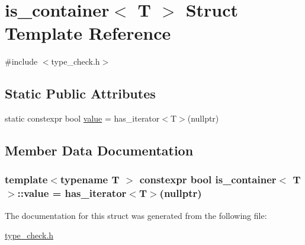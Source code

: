 \hypertarget{structis__container}{\section{is\-\_\-container$<$ T $>$ Struct Template Reference}
\label{structis__container}
}


{\ttfamily \#include $<$type\-\_\-check.\-h$>$}

\subsection*{Static Public Attributes}
\begin{DoxyCompactItemize}
\item 
static constexpr bool \hyperlink{structis__container_abe72bf896680aa10340ccf08a5d293c7}{value} = has\-\_\-iterator$<$T$>$(nullptr)
\end{DoxyCompactItemize}


\subsection{Member Data Documentation}
\hypertarget{structis__container_abe72bf896680aa10340ccf08a5d293c7}{
\subsubsection[{value}]{\setlength{\rightskip}{0pt plus 5cm}template$<$typename T $>$ constexpr bool {\bf is\-\_\-container}$<$ T $>$\-::value = has\-\_\-iterator$<$T$>$(nullptr)\hspace{0.3cm}{\ttfamily [static]}}}\label{structis__container_abe72bf896680aa10340ccf08a5d293c7}


The documentation for this struct was generated from the following file\-:\begin{DoxyCompactItemize}
\item 
\hyperlink{type__check_8h}{type\-\_\-check.\-h}\end{DoxyCompactItemize}
